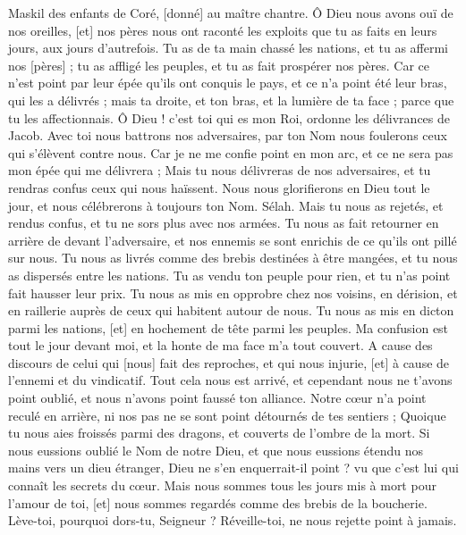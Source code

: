 \begin{multicols}{2}
\VerseOne{}Maskil des enfants de Coré, [donné] au maître chantre. Ô Dieu nous avons ouï de nos oreilles, [et] nos pères nous ont raconté les exploits que tu as faits en leurs jours, aux jours d'autrefois.
Tu as de ta main chassé les nations, et tu as affermi nos [pères] ; tu as affligé les peuples, et tu as fait prospérer nos pères.
Car ce n'est point par leur épée qu'ils ont conquis le pays, et ce n'a point été leur bras, qui les a délivrés ; mais ta droite, et ton bras, et la lumière de ta face ; parce que tu les affectionnais.
Ô Dieu ! c'est toi qui es mon Roi, ordonne les délivrances de Jacob.
Avec toi nous battrons nos adversaires, par ton Nom nous foulerons ceux qui s'élèvent contre nous.
Car je ne me confie point en mon arc, et ce ne sera pas mon épée qui me délivrera ;
Mais tu nous délivreras de nos adversaires, et tu rendras confus ceux qui nous haïssent.
Nous nous glorifierons en Dieu tout le jour, et nous célébrerons à toujours ton Nom. Sélah.
Mais tu nous as rejetés, et rendus confus, et tu ne sors plus avec nos armées.
Tu nous as fait retourner en arrière de devant l'adversaire, et nos ennemis se sont enrichis de ce qu'ils ont pillé sur nous.
Tu nous as livrés comme des brebis destinées à être mangées, et tu nous as dispersés entre les nations.
Tu as vendu ton peuple pour rien, et tu n'as point fait hausser leur prix.
Tu nous as mis en opprobre chez nos voisins, en dérision, et en raillerie auprès de ceux qui habitent autour de nous.
Tu nous as mis en dicton parmi les nations, [et] en hochement de tête parmi les peuples.
Ma confusion est tout le jour devant moi, et la honte de ma face m'a tout couvert.
A cause des discours de celui qui [nous] fait des reproches, et qui nous injurie, [et] à cause de l'ennemi et du vindicatif.
Tout cela nous est arrivé, et cependant nous ne t'avons point oublié, et nous n'avons point faussé ton alliance.
Notre cœur n'a point reculé en arrière, ni nos pas ne se sont point détournés de tes sentiers ;
Quoique tu nous aies froissés parmi des dragons, et couverts de l'ombre de la mort.
Si nous eussions oublié le Nom de notre Dieu, et que nous eussions étendu nos mains vers un dieu étranger,
Dieu ne s'en enquerrait-il point ? vu que c'est lui qui connaît les secrets du cœur.
Mais nous sommes tous les jours mis à mort pour l'amour de toi, [et] nous sommes regardés comme des brebis de la boucherie.
Lève-toi, pourquoi dors-tu, Seigneur ? Réveille-toi, ne nous rejette point à jamais.

\end{multicols}
